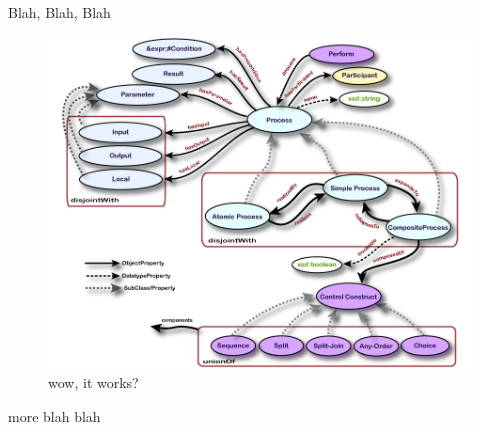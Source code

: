 Blah, Blah, Blah
\begin{figure}[htb]
\includegraphics[width=16cm]{images/OWL-S.jpg}
\caption{wow, it works?}
\label{fig:ProcessDataFlow1}
\end{figure}

more blah blah